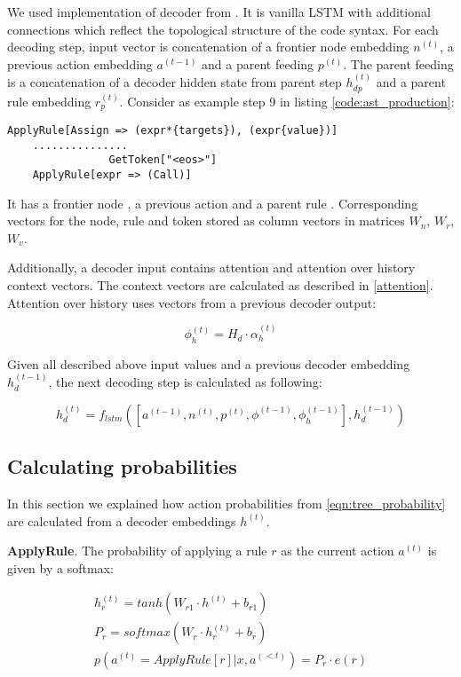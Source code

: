 We used implementation of decoder from \cite{Yin2017}. It is vanilla LSTM with additional connections which reflect the topological structure of the code syntax. For each decoding step, input vector is concatenation of a frontier node embedding $n^{(t)}$, a previous action embedding $a^{(t-1)}$ and a parent feeding $p^{(t)}$. The parent feeding is a concatenation of a decoder hidden state from parent step $h_{dp}^{(t)}$ and a parent rule embedding $r_p^{(t)}$. Consider as example step 9 in listing \ref{code:ast_production}: 
    
\begin{verbatim}
ApplyRule[Assign => (expr*{targets}), (expr{value})]
    ...............
                GetToken["<eos>"]
    ApplyRule[expr => (Call)]
\end{verbatim}

It has a frontier node , a previous action  and a parent rule . Corresponding vectors for the node, rule and token stored as column vectors in matrices $W_n$, $W_r$, $W_v$.

Additionally, a decoder input contains attention and attention over history context vectors. The context vectors are calculated as described in \cref{attention}. Attention over history uses vectors from a previous decoder output:

\begin{equation}
    \phi_h^{(t)} = H_d\cdot\alpha_h^{(t)}
\end{equation}

Given all described above input values and a previous decoder embedding $h_d^{(t-1)}$, the next decoding step is calculated as following:

\begin{equation}
    h_d^{(t)}=f_{lstm}([a^{(t-1)}, n^{(t)}, p^{(t)}, \phi^{(t-1)}, \phi_h^{(t-1)}], h_d^{(t-1)})
\end{equation}

\subsection{Calculating probabilities}
In this section we explained how action probabilities from  \cref{eqn:tree_probability} are calculated from a decoder embeddings $h^{(t)}$.

\textbf{ApplyRule}. The probability of applying a rule $r$ as the current action $a^{(t)}$ is given by a softmax:

\begin{equation}
\begin{gathered}
    h^{(t)}_r = tanh(W _{r1}\cdot h^{(t)} + b_{r1}) \\
    P_r = softmax(W_r\cdot h^{(t)}_r  + b_r) \\
    p(a^{(t)} = ApplyRule[r]|x,a^{(<t)}) = P_r\cdot e(r)
\end{gathered}
\label{eqn:apply_rule}
\end{equation}

